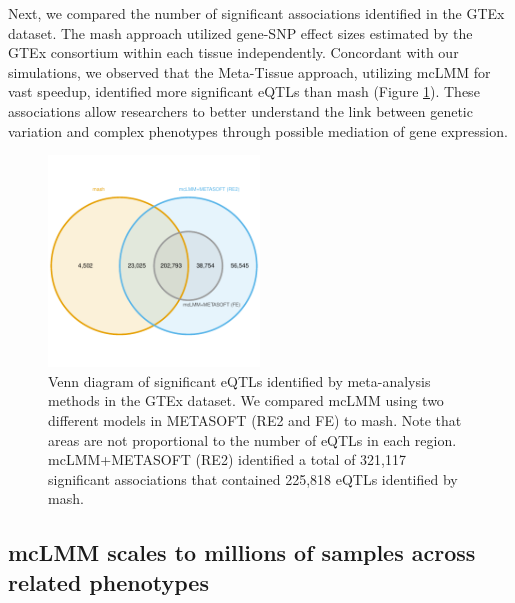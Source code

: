         Next, we compared the number of significant associations identified in the GTEx dataset. The mash approach utilized gene-SNP effect sizes estimated by the GTEx consortium within each tissue independently. Concordant with our simulations, we observed that the Meta-Tissue approach, utilizing mcLMM for vast speedup, identified more significant eQTLs than mash (Figure \ref{fig:fig3.5}). These associations allow researchers to better understand the link between genetic variation and complex phenotypes through possible mediation of gene expression. 
        
        \begin{figure}
            \centering
            \includegraphics[width=0.5\textwidth]{chapter3/figures/Figure_5.pdf}
            \caption{Venn diagram of significant eQTLs identified by meta-analysis methods in the GTEx dataset. We compared mcLMM using two different models in METASOFT (RE2 and FE) to mash. Note that areas are not proportional to the number of eQTLs in each region. mcLMM+METASOFT (RE2) identified a total of 321,117 significant associations that contained 225,818 eQTLs identified by mash.}
            \label{fig:fig3.5}
        \end{figure}
        
    \subsection{mcLMM scales to millions of samples across related phenotypes}
    
